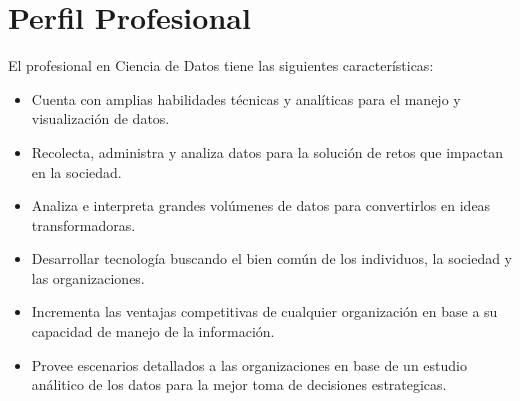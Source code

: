 \section{Perfil Profesional}\label{sec:professional-profile}
El profesional en Ciencia de Datos tiene las siguientes caracterí­sticas:

\begin{itemize}

\item Cuenta con amplias habilidades técnicas y analí­ticas para el manejo y visualización de datos.
\item Recolecta, administra y analiza datos para la solución de retos que impactan en la sociedad.
\item Analiza e interpreta grandes volúmenes de datos para convertirlos en ideas transformadoras.
\item Desarrollar tecnologí­a buscando el bien común de los individuos, la sociedad y las organizaciones.
\item Incrementa las ventajas competitivas de cualquier organización en base a su capacidad de manejo de la información.
\item Provee escenarios detallados a las organizaciones en base de un estudio análitico de los datos para la mejor toma de decisiones estrategicas.
\end{itemize}
